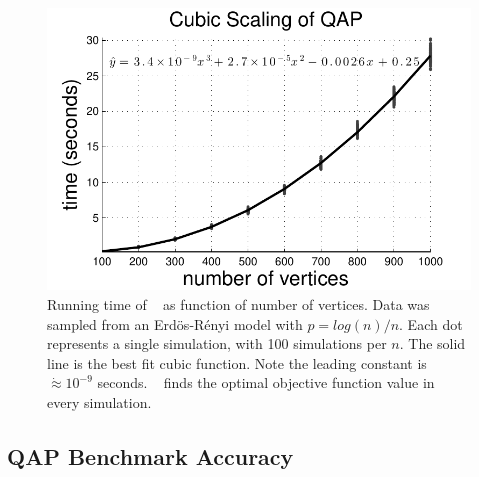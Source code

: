 \documentclass[preprint,11pt]{elsarticle}
\begin{document}
\begin{figure}[htbp]
	\centering			
	\includegraphics[width=0.7\linewidth]{../figs/ErdosRenyi_results.pdf}
	\caption{Running time of \FAQ~ as function of number of vertices. Data was sampled from an Erd\"os-R\'enyi model with $p=log(n)/n$.  Each dot represents a single simulation, with 100 simulations per $n$.  The solid line is the best fit cubic function.  Note the leading constant is $\dot{\approx} 10^{-9}$ seconds. \FAQ~ finds the optimal objective function value in every simulation.}
	\label{fig:scaling}
\end{figure}


\subsection{QAP Benchmark Accuracy} %
\label{sub:qap_benchmarks}
\end{document}

